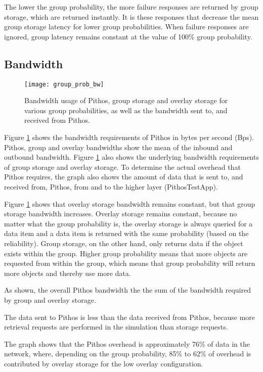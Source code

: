The lower the group probability, the more failure responses are returned by group storage, which are returned instantly. It is these responses that decrease the mean group storage latency for lower group probabilities. When failure responses are ignored, group latency remains constant at the value of 100\% group probability.

\subsection{Bandwidth}
\label{group_probability_bandwidth}

\begin{figure}[htbp]
 \centering
 \texttt{[image: group\_prob\_bw]}
 \caption{Bandwidth usage of Pithos, group storage and overlay storage for various group probabilities, as well as the bandwidth sent to, and received from Pithos.}
 \label{fig_group_prob_bw}
\end{figure}
%
Figure \ref{fig_group_prob_bw} shows the bandwidth requirements of Pithos in bytes per second (Bps). Pithos, group and overlay bandwidths show the mean of the inbound and outbound bandwidth. Figure \ref{fig_group_prob_bw} also shows the underlying bandwidth requirements of group storage and overlay storage. To determine the actual overhead that Pithos requires, the graph also shows the amount of data that is sent to, and received from, Pithos, from and to the higher layer (PithosTestApp).

Figure \ref{fig_group_prob_bw} shows that overlay storage bandwidth remains constant, but that group storage bandwidth increases. Overlay storage remains constant, because no matter what the group probability is, the overlay storage is always queried for a data item and a data item is returned with the same probability (based on the reliability). Group storage, on the other hand, only returns data if the object exists within the group. Higher group probability means that more objects are requested from within the group, which means that group probability will return more objects and thereby use more data.

As shown, the overall Pithos bandwidth the the sum of the bandwidth required by group and overlay storage.

The data sent to Pithos is less than the data received from Pithos, because more retrieval requests are performed in the simulation than storage requests.

The graph shows that the Pithos overhead is approximately 76\% of data in the network, where, depending on the group probability, 85\% to 62\% of overhead is contributed by overlay storage for the low overlay configuration.

